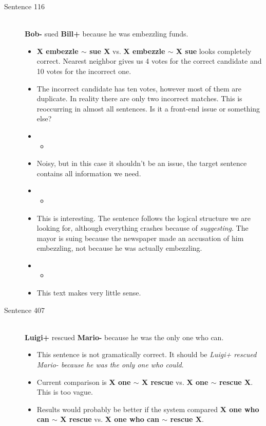 \documentclass{article}
\newcommand{\insertcode}[2]{\begin{itemize}\item[]\end{itemize}} %
\begin{document}
\begin{description}
  \item[Sentence 116] \hfill \\
  {\bf Bob-} sued {\bf Bill+} because he was embezzling funds. 
  \begin{itemize}
  	\item {\bf X embezzle $\sim$ sue X} vs. {\bf X embezzle $\sim$ X sue} looks completely correct. Nearest neighbor gives us 4 votes for the correct candidate and 10 votes for the incorrect one.
  	\item The incorrect candidate has ten votes, however most of them are duplicate. In reality there are only two incorrect matches. This is reoccurring in almost all sentences. Is it a front-end issue or something else?
  	\item \insertcode{"Scripts/116/116-1.sentence"}{Context of first incorrect vote.}
  	\item Noisy, but in this case it shouldn't be an issue, the target sentence contains all information we need.
  	\item \insertcode{"Scripts/116/116-2.sentence"}{Target sentence of first incorrect vote.}
  	\item This is interesting. The sentence follows the logical structure we are looking for, although everything crashes because of {\it suggesting}. The mayor is suing because the newspaper made an accusation of him embezzling, not because he was actually embezzling.
  	\item \insertcode{"Scripts/116/116-3.sentence"}{Context for remaining votes.}
  	\item  This text makes very little sense.
  \end{itemize}

  \item[Sentence 407] \hfill \\
  {\bf Luigi+} rescued {\bf Mario-} because he was the only one who can.
  \begin{itemize}
  	\item This sentence is not gramatically correct. It should be {\it Luigi+ rescued Mario- because he was the only one who could}.
  	\item Current comparison is {\bf X one $\sim$ X rescue} vs. {\bf X one $\sim$ rescue X}. This is too vague.
  	\item Results would probably be better if the system compared {\bf X one who can $\sim$ X rescue} vs. {\bf X one who can $\sim$ rescue X}.
  \end{itemize}


\end{description}
\end{document}
